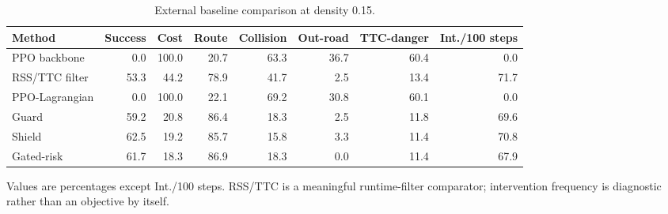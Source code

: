 
\begin{table}[t]
\centering
\caption{External baseline comparison at density 0.15.}
\label{tab_external_baseline}
\scriptsize
\setlength{\tabcolsep}{3.4pt}
\renewcommand{\arraystretch}{1.08}
\begin{tabular}{@{}lrrrrrrr@{}}
\toprule
Method & Success & Cost & Route & Collision & Out-road & TTC-danger & Int./100 steps \\
\midrule
PPO backbone & 0.0 & 100.0 & 20.7 & 63.3 & 36.7 & 60.4 & 0.0 \\
RSS/TTC filter & 53.3 & 44.2 & 78.9 & 41.7 & 2.5 & 13.4 & 71.7 \\
PPO-Lagrangian & 0.0 & 100.0 & 22.1 & 69.2 & 30.8 & 60.1 & 0.0 \\
Guard & 59.2 & 20.8 & 86.4 & 18.3 & 2.5 & 11.8 & 69.6 \\
Shield & 62.5 & 19.2 & 85.7 & 15.8 & 3.3 & 11.4 & 70.8 \\
Gated-risk & 61.7 & 18.3 & 86.9 & 18.3 & 0.0 & 11.4 & 67.9 \\
\bottomrule
\end{tabular}
\begin{tablenotes}
\item Values are percentages except Int./100 steps. RSS/TTC is a meaningful runtime-filter comparator; intervention frequency is diagnostic rather than an objective by itself.
\end{tablenotes}
\end{table}
